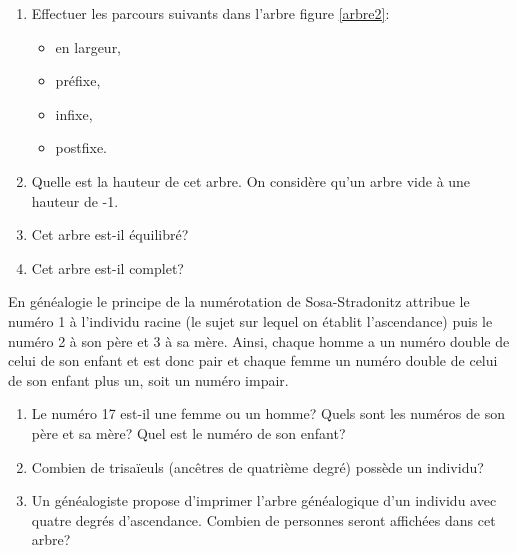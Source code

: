 \documentclass[a4paper,11pt]{article}
\begin{document}
\begin{Form}
\begin{exo}
\begin{center}
            \label{arbre2}
        \end{center}
        \begin{enumerate}
            \item Effectuer les parcours suivants dans l'arbre figure \ref{arbre2}:
                  \begin{itemize}
                      \item en largeur,
                      \item préfixe,
                      \item infixe,
                      \item postfixe.
                  \end{itemize}
            \item Quelle est la hauteur de cet arbre. On considère qu'un arbre vide à une hauteur de -1.
            \item Cet arbre est-il équilibré?
            \item Cet arbre est-il complet?
        \end{enumerate}
    \end{exo}
    \begin{exo}
        En généalogie le principe de la numérotation de Sosa-Stradonitz attribue le numéro 1 à l’individu racine (le sujet sur lequel on établit l’ascendance) puis le numéro 2 à son père et 3 à sa mère. Ainsi, chaque homme a un numéro double de celui de son enfant et est donc pair et chaque femme un numéro double de celui de son enfant plus un, soit un numéro impair.
        \begin{enumerate}
            \item Le numéro 17 est-il une femme ou un homme? Quels sont les numéros de son père et sa mère? Quel est le numéro de son enfant?
            \item Combien de trisaïeuls (ancêtres de quatrième degré) possède un individu?
            \item Un généalogiste propose d'imprimer l'arbre généalogique d'un individu avec quatre degrés d'ascendance. Combien de personnes seront affichées dans cet arbre?

\end{enumerate}
\end{exo}
\end{Form}
\end{document}
